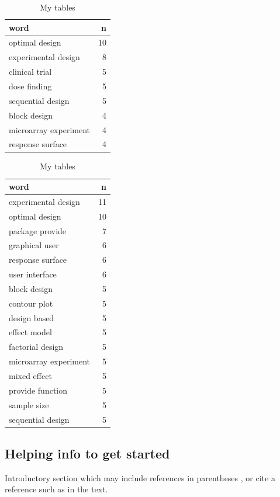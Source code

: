 \begin{table}[h] \centering  
\begin{tabular}[t]{lr}
\toprule
word & n\\
\midrule
optimal design & 10\\
experimental design & 8\\
clinical trial & 5\\
dose finding & 5\\
sequential design & 5\\
block design & 4\\
microarray experiment & 4\\
response surface & 4\\
\bottomrule
\end{tabular} \hspace{1cm} \centering  
\begin{tabular}[t]{lr}
\toprule
word & n\\
\midrule
experimental design & 11\\
optimal design & 10\\
package provide & 7\\
graphical user & 6\\
response surface & 6\\
user interface & 6\\
block design & 5\\
contour plot & 5\\
design based & 5\\
effect model & 5\\
factorial design & 5\\
microarray experiment & 5\\
mixed effect & 5\\
provide function & 5\\
sample size & 5\\
sequential design & 5\\
\bottomrule
\end{tabular} \caption{My tables} \end{table}


\hypertarget{helping-info-to-get-started}{%
\subsection{Helping info to get
started}\label{helping-info-to-get-started}}

Introductory section which may include references in parentheses
\citep{R}, or cite a reference such as \citet{R} in the text.

